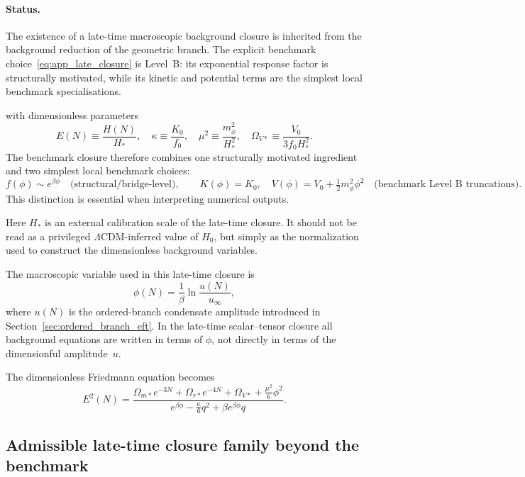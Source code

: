 \documentclass[11pt,a4paper]{article}
\numberwithin{equation}{section}
\begin{document}
\paragraph{Status.}
The existence of a late-time macroscopic background closure is inherited
from the background reduction of the geometric branch.
The explicit benchmark choice~\eqref{eq:app_late_closure} is Level~B:
its exponential response factor is structurally motivated, while its
kinetic and potential terms are the simplest local benchmark
specialisations.

with dimensionless parameters
\begin{equation}
E(N)\equiv \frac{H(N)}{H_*},
\quad
\kappa\equiv \frac{K_0}{f_0},
\quad
\mu^2\equiv \frac{m_\phi^2}{H_*^2},
\quad
\Omega_{V*}\equiv \frac{V_0}{3f_0H_*^2}.
\label{eq:app_late_defs}
\end{equation}
The benchmark closure therefore combines one structurally motivated
ingredient and two simplest local benchmark choices:
\[
f(\phi)\sim e^{\beta\phi} \quad \text{(structural/bridge-level)},\qquad
K(\phi)=K_0,\quad
V(\phi)=V_0+\tfrac12 m_\phi^2\phi^2
\quad \text{(benchmark Level~B truncations)}.
\]
This distinction is essential when interpreting numerical outputs.

Here $H_*$ is an external calibration scale of the late-time closure.
It should not be read as a privileged $\Lambda$CDM-inferred value of
$H_0$, but simply as the normalization used to construct the
dimensionless background variables.

The macroscopic variable used in this late-time closure is
\[
\phi(N)=\frac{1}{\beta}\ln\!\frac{u(N)}{u_\infty},
\]
where $u(N)$ is the ordered-branch condensate amplitude introduced in
Section~\ref{sec:ordered_branch_eft}. In the late-time scalar--tensor
closure all background equations are written in terms of $\phi$, not
directly in terms of the dimensionful amplitude~$u$.

The dimensionless Friedmann equation becomes
\begin{equation}
E^2(N)
=
\frac{
\Omega_{m*}e^{-3N}
+\Omega_{r*}e^{-4N}
+\Omega_{V*}
+\frac{\mu^2}{6}\phi^2
}{
e^{\beta \phi}
-\frac{\kappa}{6}q^2
+\beta e^{\beta \phi}q
}.
\label{eq:app_late_E2}
\end{equation}

\subsection{Admissible late-time closure family beyond the benchmark}
\label{sec:late_closure_family}
\end{document}
